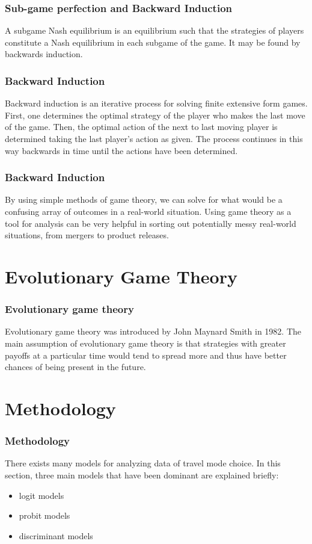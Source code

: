 \documentclass[aspectratio=169]{beamer}
\begin{document}
\begin{frame}
	\frametitle{Sub-game perfection and Backward Induction}
	A subgame Nash equilibrium is an equilibrium such that the strategies of players
constitute a Nash equilibrium in each subgame of the game. It may be found by \alert{backwards induction}.
\end{frame}
\begin{frame}
	\frametitle{Backward Induction}
Backward induction is an iterative process for solving finite extensive form games.
First, one determines the optimal strategy of the player who makes the last move of
the game. Then, the optimal action of the next to last moving player is determined
taking the last player's action as given. The process continues in this way backwards
in time until the actions have been determined.
\end{frame}
\begin{frame}
\frametitle{Backward Induction}
By using simple methods of game theory, we can solve for what would be a confusing array of outcomes in a real-world situation. Using game theory as a tool for analysis can be very helpful in sorting out potentially messy real-world situations, from mergers to product releases.

\end{frame}

\section{Evolutionary Game Theory}

\begin{frame}
	\frametitle{Evolutionary game theory}
Evolutionary game theory was introduced by John Maynard Smith in 1982. The main assumption of evolutionary game theory is that strategies with greater payoffs at a particular time would tend to spread more and thus have better chances of being present in the future.
\end{frame}

\section{Methodology}

\begin{frame}
  \frametitle{Methodology}   %
	There exists many models for analyzing data of travel mode choice. In this section, three main models that have been dominant are explained briefly:
  \begin{itemize}
  \item logit models
  \item probit models
  \item discriminant models
  \end{itemize}
\end{frame}
\end{document}
